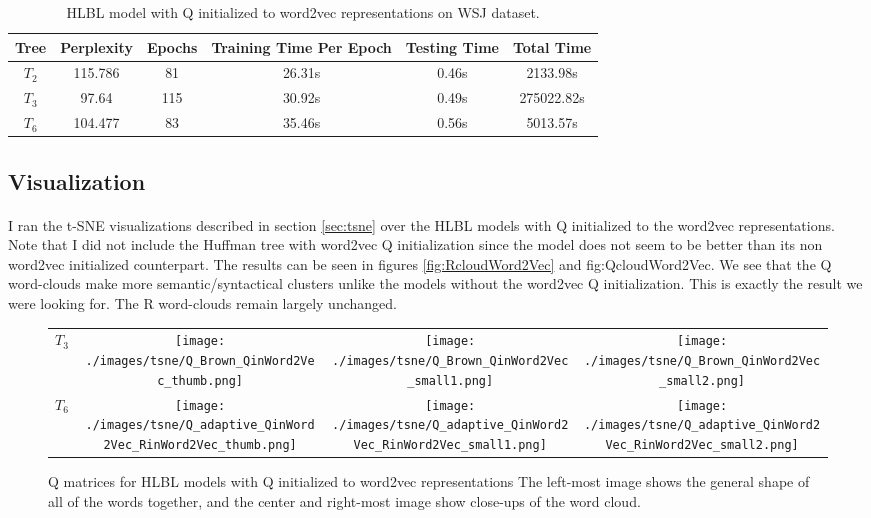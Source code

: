 \begin{table*} \centering
{}
\begin{tabular}{cccccc}\toprule
Tree & Perplexity & Epochs & Training Time Per Epoch & Testing Time & Total Time\\ 
\midrule
$T_2$ & 115.786 & 81 & 26.31s &0.46s & 2133.98s \\
$T_3$ & 97.64 & 115& 30.92s & 0.49s& 275022.82s\\
$T_6$& 104.477 & 83& 35.46s & 0.56s& 5013.57s\\
\bottomrule
\end{tabular}
\caption{HLBL model with Q initialized to word2vec representations on WSJ dataset.}
\label{tab:brownWord2vec}
\end{table*}

\subsection{Visualization}
\paragraph{}
I ran the t-SNE visualizations described in section \ref{sec:tsne} over the HLBL models with Q initialized to the word2vec representations. Note that I did not include the Huffman tree with word2vec Q initialization since the model does not seem to be better than its non word2vec initialized counterpart. The results can be seen in figures \ref{fig:RcloudWord2Vec} and {fig:QcloudWord2Vec}. We see that the Q word-clouds make more semantic/syntactical clusters unlike the models without the word2vec Q initialization. This is exactly the result we were looking for. The R word-clouds remain largely unchanged. 

\begin{figure}[p]
\centering
\begin{tabular}{@{}C{2cm}ccc@{}}
$T_3$&
\texttt{[image: ./images/tsne/Q\_Brown\_QinWord2Vec\_thumb.png]} &
\texttt{[image: ./images/tsne/Q\_Brown\_QinWord2Vec\_small1.png]} &
\texttt{[image: ./images/tsne/Q\_Brown\_QinWord2Vec\_small2.png]}
\\
$T_6$ &
\texttt{[image: ./images/tsne/Q\_adaptive\_QinWord2Vec\_RinWord2Vec\_thumb.png]} &
\texttt{[image: ./images/tsne/Q\_adaptive\_QinWord2Vec\_RinWord2Vec\_small1.png]} &
\texttt{[image: ./images/tsne/Q\_adaptive\_QinWord2Vec\_RinWord2Vec\_small2.png]}
\end{tabular}
\caption{Q matrices for HLBL models with Q initialized to word2vec representations The left-most image shows the general shape of all of the words together, and the center and right-most image show close-ups of the word cloud.}
\label{fig:QcloudWord2Vec}
\end{figure}

